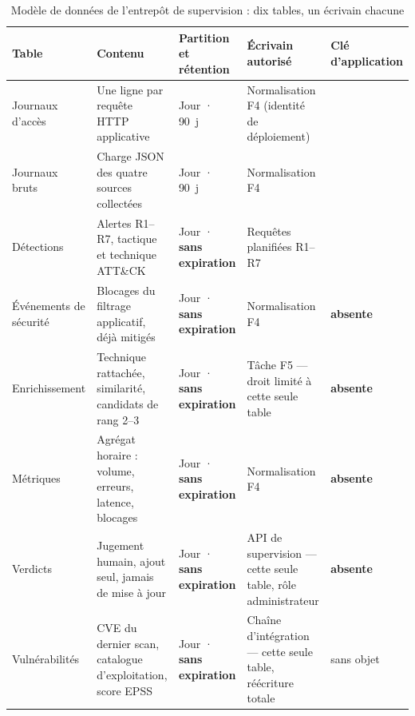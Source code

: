 \begin{table}[htbp]
\caption[Modèle de données de l'entrepôt de supervision]{Modèle de données de l'entrepôt de
supervision : dix tables, un écrivain chacune}
\label{tab:modele-donnees}
\centering
\scriptsize
\setlength{\tabcolsep}{3pt}
\renewcommand{\arraystretch}{1.15}
\begin{tabular}{|P{2.95cm}|P{3.55cm}|P{2.05cm}|P{3.75cm}|P{2.56cm}|}
\hline
\textbf{Table} & \textbf{Contenu} & \textbf{Partition et rétention} & \textbf{Écrivain autorisé} & \textbf{Clé d'application} \\
\hline
Journaux d'accès\newline {} & Une ligne par requête HTTP applicative & Jour · 90~j & Normalisation F4 (identité de déploiement) &  \\ \hline
Journaux bruts\newline {} & Charge JSON des quatre sources collectées & Jour · 90~j & Normalisation F4 &  \\ \hline
Détections\newline {} & Alertes R1--R7, tactique et technique ATT\&CK & Jour · \textbf{sans expiration} & Requêtes planifiées R1--R7 &  \\ \hline
Événements de sécurité\newline {} & Blocages du filtrage applicatif, déjà mitigés & Jour · \textbf{sans expiration} & Normalisation F4 & \textbf{absente} \\ \hline
Enrichissement\newline {} & Technique rattachée, similarité, candidats de rang 2--3 & Jour · \textbf{sans expiration} & Tâche F5 --- droit limité à cette seule table & \textbf{absente} \\ \hline
Métriques\newline {} & Agrégat horaire : volume, erreurs, latence, blocages & Jour · \textbf{sans expiration} & Normalisation F4 & \textbf{absente} \\ \hline
Verdicts\newline {} & Jugement humain, ajout seul, jamais de mise à jour & Jour · \textbf{sans expiration} & API de supervision --- cette seule table, rôle administrateur & \textbf{absente} \\ \hline
Vulnérabilités\newline {} & CVE du dernier scan, catalogue d'exploitation, score EPSS & Jour · \textbf{sans expiration} & Chaîne d'intégration --- cette seule table, réécriture totale & sans objet \\ \hline

\end{tabular}
\end{table}
